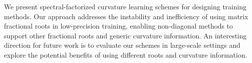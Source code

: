 \vspace{-0.2cm}
We present spectral-factorized curvature learning schemes for designing training methods. Our approach addresses the instability and inefficiency of using matrix fractional roots in low-precision training, enabling non-diagonal methods to support other fractional roots and generic curvature information.
An interesting direction for future work is to evaluate our schemes in large-scale settings and explore the potential benefits of using different  roots and curvature information.
\newpage

%



%
%
%
%
